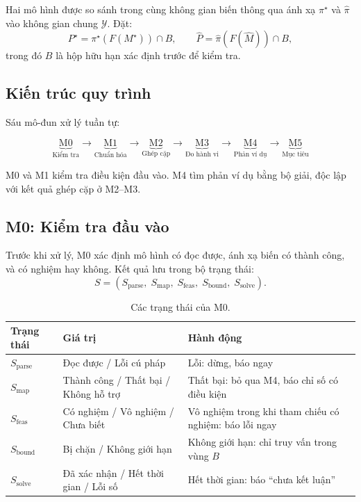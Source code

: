 \documentclass[11pt,a4paper]{article}
\theoremstyle{plain}
\theoremstyle{definition}
\theoremstyle{remark}
\newcommand{\GT}{M^{\star}}
\newcommand{\LLM}{\widehat{M}}
\newcommand{\Pgt}{P^{\star}}
\newcommand{\Pllm}{\widehat{P}}
\begin{document}
Hai mô hình được so sánh trong cùng không gian biến thông qua ánh xạ $\pi^\star$
và $\widehat\pi$ vào không gian chung $\mathcal{Y}$. Đặt:
\[
  \Pgt = \pi^\star(F(\GT)) \cap B, \qquad \Pllm = \widehat\pi(F(\LLM)) \cap B,
\]
trong đó $B$ là hộp hữu hạn xác định trước để kiểm tra.

\subsection{Kiến trúc quy trình}

Sáu mô-đun xử lý tuần tự:

\begin{equation*}
  \underbrace{\text{M0}}_{\text{Kiểm tra}}
  \to\underbrace{\text{M1}}_{\text{Chuẩn hóa}}
  \to\underbrace{\text{M2}}_{\text{Ghép cặp}}
  \to\underbrace{\text{M3}}_{\text{Đo hành vi}}
  \to\underbrace{\text{M4}}_{\text{Phản ví dụ}}
  \to\underbrace{\text{M5}}_{\text{Mục tiêu}}
\end{equation*}

M0 và M1 kiểm tra điều kiện đầu vào.
M4 tìm phản ví dụ bằng bộ giải, độc lập với kết quả ghép cặp ở M2--M3.

\subsection{M0: Kiểm tra đầu vào}

Trước khi xử lý, M0 xác định mô hình có đọc được, ánh xạ biến có thành công,
và có nghiệm hay không. Kết quả lưu trong bộ trạng thái:
\[
  S = (S_{\mathrm{parse}},\; S_{\mathrm{map}},\; S_{\mathrm{feas}},\;
       S_{\mathrm{bound}},\; S_{\mathrm{solve}}).
\]

\begin{table}[H]
\centering
\caption{Các trạng thái của M0.}
\label{tab:states}
\small
\begin{tabularx}{\textwidth}{L{3.2cm} L{3.5cm} Y}
\toprule
\textbf{Trạng thái} & \textbf{Giá trị} & \textbf{Hành động} \\
\midrule
$S_{\mathrm{parse}}$ & Đọc được / Lỗi cú pháp
  & Lỗi: dừng, báo ngay \\
$S_{\mathrm{map}}$ & Thành công / Thất bại / Không hỗ trợ
  & Thất bại: bỏ qua M4, báo chỉ số có điều kiện \\
$S_{\mathrm{feas}}$ & Có nghiệm / Vô nghiệm / Chưa biết
  & Vô nghiệm trong khi tham chiếu có nghiệm: báo lỗi ngay \\
$S_{\mathrm{bound}}$ & Bị chặn / Không giới hạn
  & Không giới hạn: chỉ truy vấn trong vùng $B$ \\
$S_{\mathrm{solve}}$ & Đã xác nhận / Hết thời gian / Lỗi số
  & Hết thời gian: báo ``chưa kết luận'' \\
\bottomrule
\end{tabularx}
\end{table}
\end{document}
